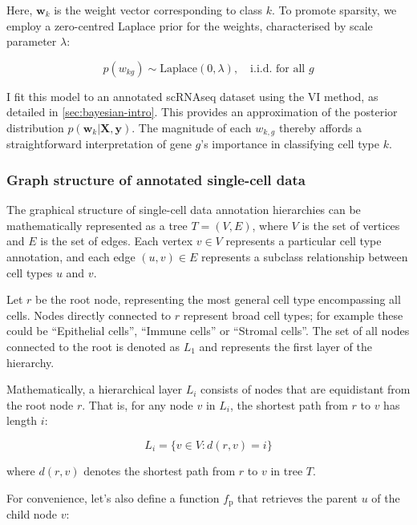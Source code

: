 Here, $\mathbf{w}_k$ is the weight vector corresponding to class $k$. To promote sparsity, we employ a zero-centred Laplace prior for the weights, characterised by scale parameter $\lambda$:

\begin{equation}
    \label{eq:logistic-regression-prior}
    p(w_{kg}) \sim \text{Laplace}(0, \lambda),\quad\text{i.i.d. for all } g 
\end{equation}

I fit this model to an annotated \ac{scRNAseq} dataset using the \ac{VI} method, as detailed in \cref{sec:bayesian-intro}. This provides an approximation of the posterior distribution $p(\mathbf{w}_k | \mathbf{X}, \mathbf{y})$. The magnitude of each $w_{k,g}$ thereby affords a straightforward interpretation of gene $g$'s importance in classifying cell type $k$.

\subsubsection*{Graph structure of annotated single-cell data}

The graphical structure of single-cell data annotation hierarchies can be mathematically represented as a tree $T = (V, E)$, where $V$ is the set of vertices and $E$ is the set of edges. Each vertex $v \in V$ represents a particular cell type annotation, and each edge $(u, v) \in E$ represents a subclass relationship between cell types $u$ and $v$. 

Let $r$ be the root node, representing the most general cell type encompassing all cells. Nodes directly connected to $r$ represent broad cell types; for example these could be ``Epithelial cells'', ``Immune cells'' or ``Stromal cells''. The set of all nodes connected to the root is denoted as $L_1$ and represents the first layer of the hierarchy. 

Mathematically, a hierarchical layer $L_i$ consists of nodes that are equidistant from the root node $r$. That is, for any node $v$ in $L_i$, the shortest path from $r$ to $v$ has length $i$:

\begin{equation}
    L_i = \{v \in V : d(r, v) = i\}
\end{equation}

where $d(r,v)$ denotes the shortest path from $r$ to $v$ in tree $T$. 

For convenience, let's also define a function $f_{\text{p}}$  that retrieves the parent $u$ of the child node $v$:

